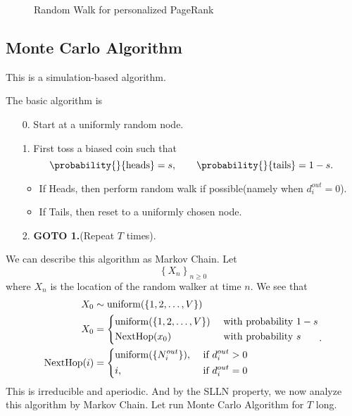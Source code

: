 \begin{figure}[H]
	\centering
	\caption{Random Walk for personalized PageRank}
	\label{fig:personalized-pagerank}
\end{figure}

\subsection{Monte Carlo Algorithm}
\begin{note}
	This is a simulation-based algorithm.
\end{note}

The basic algorithm is
\begin{enumerate}
	\item[0.] Start at a uniformly random node.
	\item[1.] First toss a biased coin such that
		\[
			\probability{}{\text{heads}} = s,\qquad \probability{}{\text{tails}} = 1 - s.
		\]
		\begin{itemize}
			\item If Heads, then perform random walk if possible(namely when \(d_i^{out}=0\)).
			\item If Tails, then reset to a uniformly chosen node.
		\end{itemize}
	\item[2.] \textbf{GOTO 1.}(Repeat \(T\) times).
\end{enumerate}

We can describe this algorithm as Markov Chain. Let
\[
	\left\{ X_n \right\}_{n\geq 0}
\]
where \(X_n\) is the location of the random walker at time \(n\). We see that
\[
	\begin{split}
		X_0 &\sim \mathrm{uniform}(\{1, 2, \ldots , V\})\\
		X_0 &=\begin{dcases}
			\mathrm{uniform}(\{1, 2, \ldots , V\}) & \text{ with probability }1 - s \\
			\mathrm{NextHop}(x_0)                  & \text{ with probability }s     \\
		\end{dcases}\\
		\mathrm{NextHop}(i)&=\begin{dcases}
			\mathrm{uniform}(\{N^{out}_i\}), & \text{ if }d^{out}_i>0   \\
			i,                               & \text{ if }d^{out}_i = 0
		\end{dcases}
	\end{split}.
\]
This is irreducible and aperiodic. And by the SLLN property, we now analyze this algorithm by Markov Chain. Let run Monte Carlo Algorithm
for \(T\) long.

